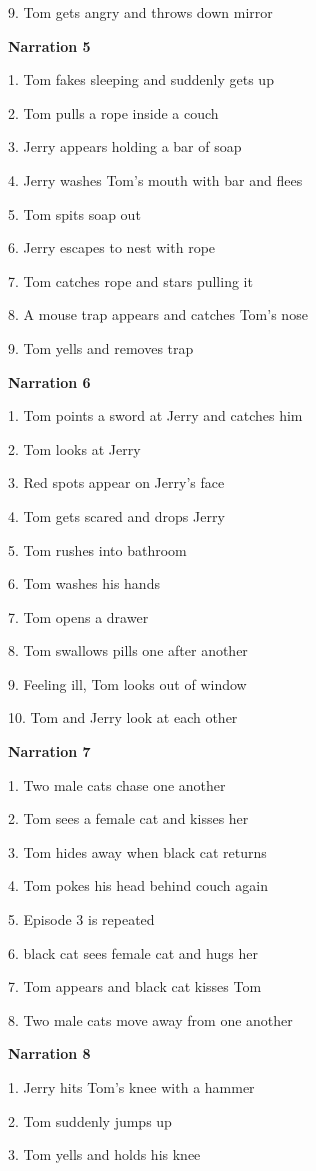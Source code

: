 \documentclass[]{elsarticle} %
\begin{document}
9. Tom gets angry and throws down mirror

\textbf{Narration 5}

1. Tom fakes sleeping and suddenly gets up

2. Tom pulls a rope inside a couch

3. Jerry appears holding a bar of soap

4. Jerry washes Tom's mouth with bar and flees

5. Tom spits soap out

6. Jerry escapes to nest with rope

7. Tom catches rope and stars pulling it

8. A mouse trap appears and catches Tom's nose

9. Tom yells and removes trap

\textbf{Narration 6}

1. Tom points a sword at Jerry and catches him

2. Tom looks at Jerry

3. Red spots appear on Jerry's face

4. Tom gets scared and drops Jerry

5. Tom rushes into bathroom

6. Tom washes his hands

7. Tom opens a drawer

8. Tom swallows pills one after another

9. Feeling ill, Tom looks out of window

10. Tom and Jerry look at each other

\textbf{Narration 7}

1. Two male cats chase one another

2. Tom sees a female cat and kisses her

3. Tom hides away when black cat returns

4. Tom pokes his head behind couch again

5. Episode 3 is repeated

6. black cat sees female cat and hugs her

7. Tom appears and black cat kisses Tom

8. Two male cats move away from one another

\textbf{Narration 8}

1. Jerry hits Tom's knee with a hammer

2. Tom suddenly jumps up

3. Tom yells and holds his knee
\end{document}
